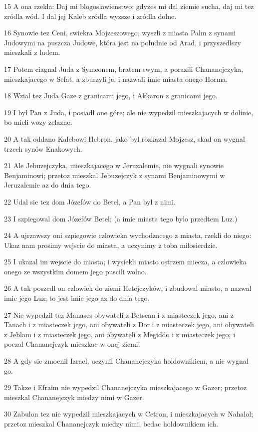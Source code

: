 \par 15 A ona rzekla: Daj mi blogoslawienstwo; gdyzes mi dal ziemie sucha, daj mi tez zródla wód. I dal jej Kaleb zródla wyzsze i zródla dolne.
\par 16 Synowie tez Ceni, swiekra Mojzeszowego, wyszli z miasta Palm z synami Judowymi na puszcza Judowe, która jest na poludnie od Arad, i przyszedlszy mieszkali z ludem.
\par 17 Potem ciagnal Juda z Symeonem, bratem swym, a porazili Chananejczyka, mieszkajacego w Sefat, a zburzyli je, i nazwali imie miasta onego Horma.
\par 18 Wzial tez Juda Gaze z granicami jego, i Akkaron z granicami jego.
\par 19 I byl Pan z Juda, i posiadl one góre; ale nie wypedzil mieszkajacych w dolinie, bo mieli wozy zelazne.
\par 20 A tak oddano Kalebowi Hebron, jako byl rozkazal Mojzesz, skad on wygnal trzech synów Enakowych.
\par 21 Ale Jebuzejczyka, mieszkajacego w Jeruzalemie, nie wygnali synowie Benjaminowi; przetoz mieszkal Jebuzejczyk z synami Benjaminowymi w Jeruzalemie az do dnia tego.
\par 22 Udal sie tez dom Józefów do Betel, a Pan byl z nimi.
\par 23 I szpiegowal dom Józefów Betel; (a imie miasta tego bylo przedtem Luz.)
\par 24 A ujrzawszy oni szpiegowie czlowieka wychodzacego z miasta, rzekli do niego: Ukaz nam prosimy wejscie do miasta, a uczynimy z toba milosierdzie.
\par 25 I ukazal im wejscie do miasta; i wysiekli miasto ostrzem miecza, a czlowieka onego ze wszystkim domem jego puscili wolno.
\par 26 A tak poszedl on czlowiek do ziemi Hetejczyków, i zbudowal miasto, a nazwal imie jego Luz; to jest imie jego az do dnia tego.
\par 27 Nie wypedzil tez Manases obywateli z Betsean i z miasteczek jego, ani z Tanach i z miasteczek jego, ani obywateli z Dor i z miasteczek jego, ani obywateli z Jeblam i z miasteczek jego, ani obywateli z Megiddo i z miasteczek jego; i poczal Chananejczyk mieszkac w onej ziemi.
\par 28 A gdy sie zmocnil Izrael, uczynil Chananejczyka holdownikiem, a nie wygnal go.
\par 29 Takze i Efraim nie wypedzil Chananejczyka mieszkajacego w Gazer; przetoz mieszkal Chananejczyk miedzy nimi w Gazer.
\par 30 Zabulon tez nie wypedzil mieszkajacych w Cetron, i mieszkajacych w Nahalol; przetoz mieszkal Chananejczyk miedzy nimi, bedac holdownikiem ich.
